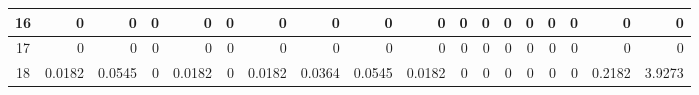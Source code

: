 \begin{table}[ht]
\begin{adjustbox}{width = \textwidth, center}
\begin{tabular}{|c|r|r|r|r|r|r|r|r|r|r|r|r|r|r|r|r|r|}
            \rowcolor[HTML]{FFFFFF} 
            \cellcolor[HTML]{CFE2F3}16                           & 0                                              & 0                                              & 0                                              & 0                                              & 0                                              & 0                                              & 0                                              & 0                                               & 0                                               & 0                                               & 0                                               & 0                                               & 0                                               & 0                                               & 0                                               & \cellcolor[HTML]{D9D2E9}0                                                             & \cellcolor[HTML]{D9D2E9}0                                                                 \\ \hline
            \rowcolor[HTML]{FFFFFF} 
            \cellcolor[HTML]{CFE2F3}17                           & 0                                              & 0                                              & 0                                              & 0                                              & 0                                              & 0                                              & 0                                              & 0                                               & 0                                               & 0                                               & 0                                               & 0                                               & 0                                               & 0                                               & 0                                               & \cellcolor[HTML]{D9D2E9}0                                                             & \cellcolor[HTML]{D9D2E9}0                                                                 \\ \hline
            \cellcolor[HTML]{CFE2F3}18                           & \cellcolor[HTML]{C7E9D8}0.0182                 & \cellcolor[HTML]{57BB8A}0.0545                 & \cellcolor[HTML]{FFFFFF}0                      & \cellcolor[HTML]{C7E9D8}0.0182                 & \cellcolor[HTML]{FFFFFF}0                      & \cellcolor[HTML]{C7E9D8}0.0182                 & \cellcolor[HTML]{8FD2B1}0.0364                 & \cellcolor[HTML]{57BB8A}0.0545                  & \cellcolor[HTML]{C7E9D8}0.0182                  & \cellcolor[HTML]{FFFFFF}0                       & \cellcolor[HTML]{FFFFFF}0                       & \cellcolor[HTML]{FFFFFF}0                       & \cellcolor[HTML]{FFFFFF}0                       & \cellcolor[HTML]{FFFFFF}0                       & \cellcolor[HTML]{FFFFFF}0                       & \cellcolor[HTML]{D9D2E9}0.2182                                                        & \cellcolor[HTML]{D9D2E9}3.9273                                                            \\ \hline

\end{tabular}
\end{adjustbox}
\end{table}
